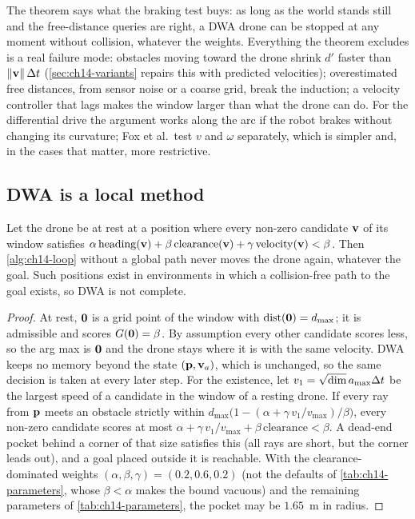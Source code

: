 The theorem says what the braking test buys: as long as the world stands
still and the free-distance queries are right, a DWA drone can be stopped at
any moment without collision, whatever the weights. Everything the theorem
excludes is a real failure mode: obstacles moving toward the drone shrink
$d'$ faster than $\left\lVert \mathbf{v} \right\rVert\Delta t$ (\cref{sec:ch14-variants} repairs this with
predicted velocities); overestimated free distances, from sensor noise or a
coarse grid, break the induction; a velocity controller that lags makes the
window larger than what the drone can do. For the differential drive the
argument works along the arc if the robot brakes without changing its
curvature; Fox et al.\ test $v$ and $\omega$ separately, which is simpler and, in the
cases that matter, more restrictive.

\subsection{DWA is a local method}

\begin{proposition}
\label{thm:ch14-incomplete}
Let the drone be at rest at a position where every non-zero candidate
$\mathbf{v}$ of its window satisfies
$\alpha\,\mathrm{heading}(\mathbf{v}) + \beta\,\mathrm{clearance}(\mathbf{v}) +
\gamma\,\mathrm{velocity}(\mathbf{v}) < \beta$. Then \cref{alg:ch14-loop} without
a global path never moves the drone again, whatever the goal. Such
positions exist in environments in which a collision-free path to the goal
exists, so DWA is not complete.
\end{proposition}
\begin{proof}
At rest, $\mathbf{0}$ is a grid point of the window with $\operatorname{dist}(\mathbf{0}) =
d_{\max}$; it is admissible and scores $G(\mathbf{0}) = \beta$. By assumption
every other candidate scores less, so the arg max is $\mathbf{0}$ and the
drone stays where it is with the same velocity. DWA keeps no memory beyond
the state $(\mathbf{p}, \mathbf{v}_a)$, which is unchanged, so the same decision is
taken at every later step. For the existence, let $v_1 = \sqrt{\dim}\,
a_{\max}\Delta t$ be the largest speed of a candidate in the window of a resting
drone. If every ray from $\mathbf{p}$ meets an obstacle strictly within
$d_{\max}\bigl(1 - (\alpha + \gamma\,v_1/v_{\max})/\beta\bigr)$, every
non-zero candidate scores at most $\alpha + \gamma\,v_1/v_{\max} +
\beta\,\mathrm{clearance} < \beta$. A dead-end pocket behind a corner of
that size satisfies this (all rays are short, but the corner leads out),
and a goal placed outside it is reachable. With the clearance-dominated
weights $(\alpha, \beta, \gamma) = (0.2, 0.6, 0.2)$ (not the defaults of
\cref{tab:ch14-parameters}, whose $\beta < \alpha$ makes the bound vacuous) and
the remaining parameters of \cref{tab:ch14-parameters}, the pocket may be
$1.65$~m in radius.
\end{proof}

